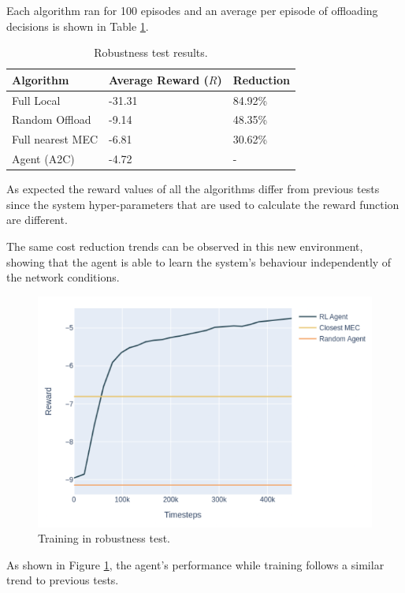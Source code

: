 \documentclass[conference]{IEEEtran}
\begin{document}
Each algorithm ran for 100 episodes and an average per episode of offloading decisions is shown in Table \ref{robust_table}.

\begin{table}[H]
\centering
\begin{tabular}{|l|l|l|}
\hline
Algorithm        & Average Reward ($R$) & Reduction\\ \hline
Full Local       & -31.31 & 84.92\%\\
Random Offload   & -9.14 & 48.35\%\\
Full nearest MEC & -6.81 & 30.62\%\\ 
Agent (A2C) & -4.72 & -\\ \hline
\end{tabular}
\caption{Robustness test results.} \label{robust_table}
\end{table}

As expected the reward values of all the algorithms differ from previous tests since the system hyper-parameters that are used to calculate the reward function are different.

The same cost reduction trends can be observed in this new environment, showing that the agent is able to learn the system's behaviour independently of the network conditions.

\begin{figure}[H]
  \centering
  \includegraphics[width=\linewidth]{images/5_10_training_new.png}
  \caption{Training in robustness test.}  \label{robust_training}
\end{figure}

As shown in Figure \ref{robust_training}, the agent's performance while training follows a similar trend to previous tests.
\end{document}
